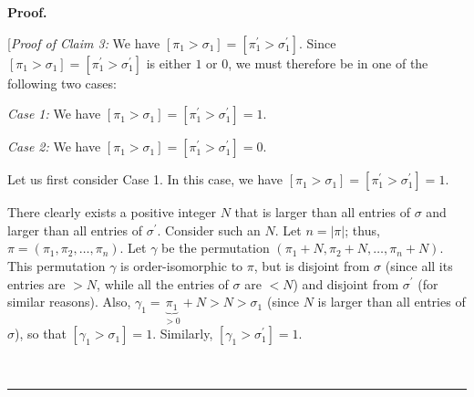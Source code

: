 \documentclass[numbers=enddot,12pt,final,onecolumn,notitlepage]{scrartcl}%
\theoremstyle{definition}
\newenvironment{statement}{\begin{quote}}{\end{quote}}
\newenvironment{proof}[1][Proof]{\noindent\textbf{#1.} }{\ \rule{0.5em}{0.5em}}
\begin{document}
\begin{proof}
\begin{statement}
\end{statement}

[\textit{Proof of Claim 3:} We have $\left[  \pi_{1}>\sigma_{1}\right]
=\left[  \pi_{1}^{\prime}>\sigma_{1}^{\prime}\right]  $. Since $\left[
\pi_{1}>\sigma_{1}\right]  =\left[  \pi_{1}^{\prime}>\sigma_{1}^{\prime
}\right]  $ is either $1$ or $0$, we must therefore be in one of the following
two cases:

\textit{Case 1:} We have $\left[  \pi_{1}>\sigma_{1}\right]  =\left[  \pi
_{1}^{\prime}>\sigma_{1}^{\prime}\right]  =1$.

\textit{Case 2:} We have $\left[  \pi_{1}>\sigma_{1}\right]  =\left[  \pi
_{1}^{\prime}>\sigma_{1}^{\prime}\right]  =0$.

Let us first consider Case 1. In this case, we have $\left[  \pi_{1}%
>\sigma_{1}\right]  =\left[  \pi_{1}^{\prime}>\sigma_{1}^{\prime}\right]  =1$.

There clearly exists a positive integer $N$ that is larger than all entries of
$\sigma$ and larger than all entries of $\sigma^{\prime}$. Consider such an
$N$. Let $n=\left\vert \pi\right\vert $; thus, $\pi=\left(  \pi_{1},\pi
_{2},\ldots,\pi_{n}\right)  $. Let $\gamma$ be the permutation $\left(
\pi_{1}+N,\pi_{2}+N,\ldots,\pi_{n}+N\right)  $. This permutation $\gamma$ is
order-isomorphic to $\pi$, but is disjoint from $\sigma$ (since all its
entries are $>N$, while all the entries of $\sigma$ are $<N$) and disjoint
from $\sigma^{\prime}$ (for similar reasons). Also, $\gamma_{1}%
=\underbrace{\pi_{1}}_{>0}+N>N>\sigma_{1}$ (since $N$ is larger than all
entries of $\sigma$), so that $\left[  \gamma_{1}%
>\sigma_{1}\right]  =1$. Similarly, $\left[  \gamma_{1}>\sigma_{1}^{\prime
}\right]  =1$.


\end{proof}
\end{document}
